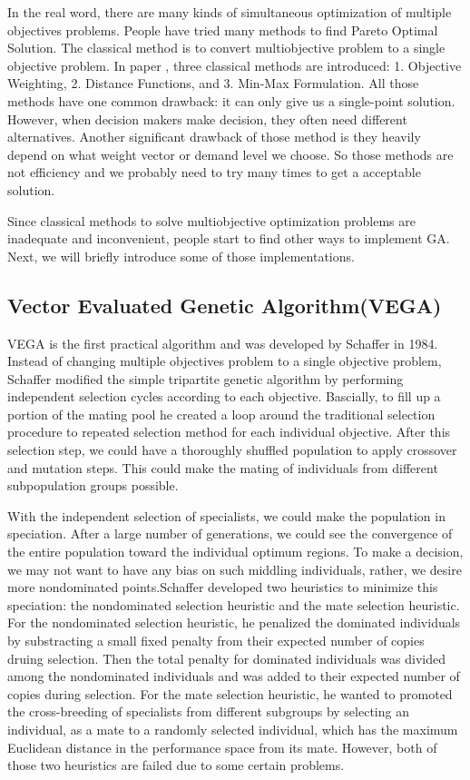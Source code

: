 In the real word, there are many kinds of simultaneous optimization of multiple objectives problems. People have tried many methods to find Pareto Optimal Solution. The classical method is to convert multiobjective problem to a single objective problem. In paper \cite{NSGA_1994}, three classical methods are introduced: 1. Objective Weighting, 2. Distance Functions, and 3. Min-Max Formulation. All those methods have one common drawback: it can only give us a single-point solution. However, when decision makers make decision, they often need different alternatives. Another significant drawback of those method is they heavily depend on what weight vector or demand level we choose. So those methods are not efficiency and we probably need to try many times to get a acceptable solution.

Since classical methods to solve multiobjective optimization problems are inadequate and inconvenient, people start to find other ways to implement GA. Next, we will briefly introduce some of those implementations.

\subsection{Vector Evaluated Genetic Algorithm(VEGA)}
VEGA is the first practical algorithm and was developed by Schaffer in 1984\cite{Schaffer_1984_Some}. Instead of changing multiple objectives problem to a single objective problem, Schaffer modified the simple tripartite genetic algorithm by performing independent selection cycles according to each objective\cite{Schaffer_1984_Some}. Bascially, to fill up a portion of the mating pool he created a loop around the traditional selection procedure to repeated selection method for each individual objective. After this selection step, we could have a thoroughly shuffled population to apply crossover and mutation steps. This could make the mating of individuals from different subpopulation groups possible.

With the independent selection of specialists, we could make the population in speciation. After a large number of generations, we could see the convergence of the entire population toward the individual optimum regions. To make a decision, we may not want to have any bias on such middling individuals, rather, we desire more nondominated points.Schaffer developed two heuristics to minimize this speciation: the nondominated selection heuristic and the mate selection heuristic. For the nondominated selection heuristic, he penalized the dominated individuals by substracting a small fixed penalty from their expected number of copies druing selection. Then the total penalty for dominated individuals was divided among the nondominated individuals and was added to their expected number of copies during selection. For the mate selection heuristic, he wanted to promoted the cross-breeding of specialists from different subgroups by selecting an individual, as a mate to a randomly selected individual, which has the maximum Euclidean distance in the performance space from its mate. However, both of those two heuristics are failed due to some certain problems.

